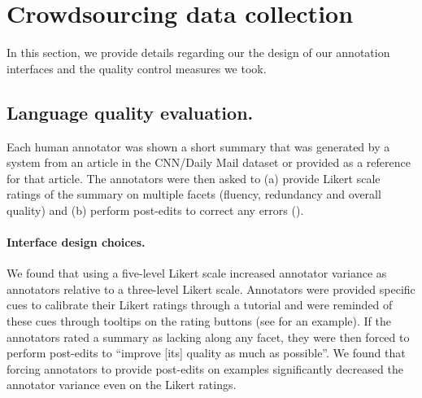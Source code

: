 \section{\label{sec:interfaces} Crowdsourcing data collection}

In this section, we provide details regarding our the design of our annotation interfaces and the quality control measures we took.

\subsection{Language quality evaluation.}
Each human annotator was shown a short summary that was generated by a system from an article in the CNN/Daily Mail dataset or provided as a reference for that article.
The annotators were then asked to (a) provide Likert scale ratings of the summary on multiple facets (fluency, redundancy and overall quality) and (b) perform post-edits to correct any errors ().

\paragraph{Interface design choices.}
We found that using a five-level Likert scale increased annotator variance as annotators relative to a three-level Likert scale.
Annotators were provided specific cues to calibrate their Likert ratings through a tutorial and were reminded of these cues through tooltips on the rating buttons (see  for an example).
If the annotators rated a summary as lacking along any facet, they were then forced to perform post-edits to ``improve [its] quality as much as possible''.
We found that forcing annotators to provide post-edits on examples significantly decreased the annotator variance even on the Likert ratings.

